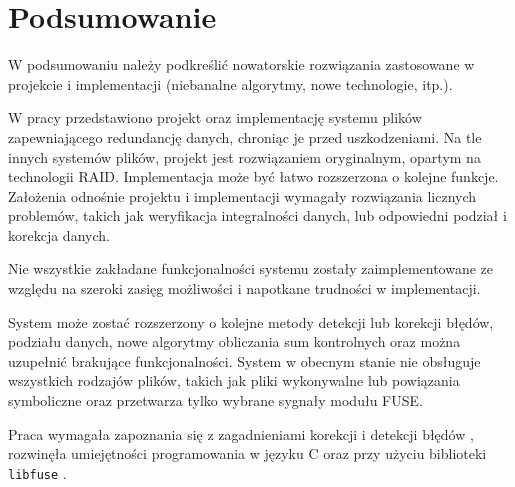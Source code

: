 \chapter{Podsumowanie}
\thispagestyle{chapterBeginStyle}

W podsumowaniu należy podkreślić nowatorskie rozwiązania zastosowane w projekcie i implementacji (niebanalne algorytmy, nowe technologie, itp.).

W pracy przedstawiono projekt oraz implementację systemu plików zapewniającego redundancję danych, chroniąc je przed uszkodzeniami. Na tle innych systemów plików, projekt jest rozwiązaniem oryginalnym, opartym na technologii RAID. Implementacja może być łatwo rozszerzona o kolejne funkcje. Założenia odnośnie projektu i implementacji wymagały rozwiązania licznych problemów, takich jak weryfikacja integralności danych, lub odpowiedni  podział i korekcja danych.

Nie wszystkie zakładane funkcjonalności systemu zostały zaimplementowane ze względu na szeroki zasięg możliwości i napotkane trudności w implementacji.

System może zostać rozszerzony o kolejne metody detekcji lub korekcji błędów, podziału danych, nowe algorytmy obliczania sum kontrolnych oraz można uzupełnić brakujące funkcjonalności. System w obecnym stanie nie obsługuje wszystkich rodzajów plików, takich jak pliki wykonywalne lub powiązania symboliczne oraz przetwarza tylko wybrane sygnały modułu FUSE.

Praca wymagała zapoznania się z zagadnieniami korekcji i detekcji błędów \cite{Coding}, rozwinęła umiejętności programowania w języku C \cite{MAN} oraz przy użyciu biblioteki \verb|libfuse| \cite{FUSE_Docs}.
